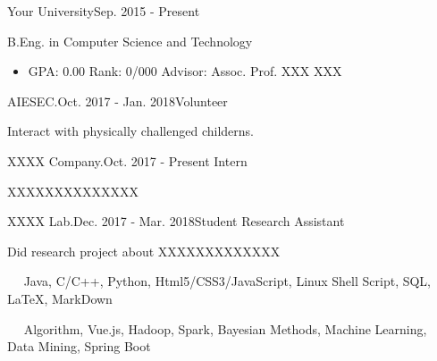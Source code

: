 \documentclass{sorahjy_cv}
\begin{document}
\pagestyle{empty}


\begin{cvHeader}
\end{cvHeader}

%
%

\begin{sectionContentSimple}{Your University}{Sep. 2015 - Present}
	\item B.Eng. in Computer Science and Technology
	\begin{itemize}
		\item GPA: 0.00 \quad Rank: 0/000 \quad Advisor: Assoc. Prof. XXX XXX
	\end{itemize}
\end{sectionContentSimple}

%
%


\begin{sectionContentNormal}{AIESEC.}{Oct. 2017 - Jan. 2018}{Volunteer}
	\item Interact with physically challenged childerns.
\end{sectionContentNormal}

\begin{sectionContentNormal}{XXXX Company.}{Oct. 2017 - Present }{Intern}
	\item XXXXXXXXXXXXXX
\end{sectionContentNormal}

\begin{sectionContentNormal}{XXXX Lab.}{Dec. 2017 - Mar. 2018}{Student Research Assistant}
	\item Did research project about XXXXXXXXXXXXX
\end{sectionContentNormal}


%
%

\begin{description}{}
	\item{\ \ }  Java, C/C++, Python, Html5/CSS3/JavaScript, Linux Shell Script, SQL, \LaTeX, MarkDown
	\item{\ \ } Algorithm, Vue.js, Hadoop, Spark, Bayesian Methods, Machine Learning, Data Mining, Spring Boot
\end{description}
\end{document}
